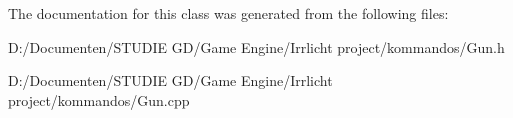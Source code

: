 The documentation for this class was generated from the following files\+:\begin{DoxyCompactItemize}
\item 
D\+:/\+Documenten/\+S\+T\+U\+D\+I\+E G\+D/\+Game Engine/\+Irrlicht project/kommandos/Gun.\+h\item 
D\+:/\+Documenten/\+S\+T\+U\+D\+I\+E G\+D/\+Game Engine/\+Irrlicht project/kommandos/Gun.\+cpp\end{DoxyCompactItemize}
